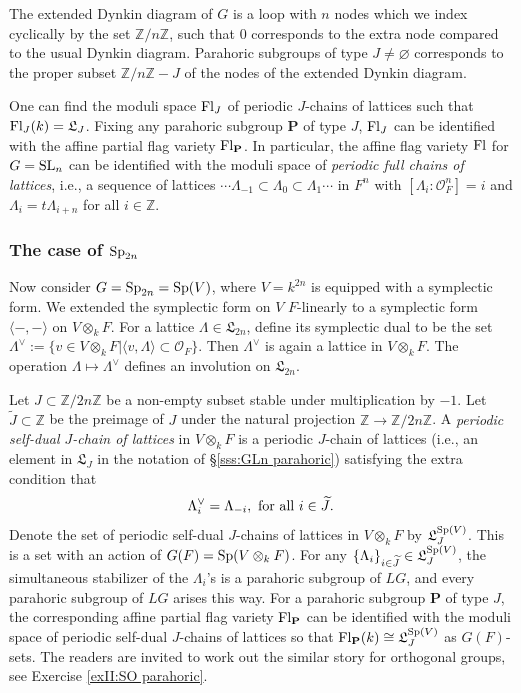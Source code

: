 \documentclass[]{pcmi}
\let\oldsubsubsection\subsubsection
\renewcommand{\subsubsection}[1]{%
\setcounter{subsubsection}{\value{equation}}%
\oldsubsubsection{#1}%
\refstepcounter{equation}%
}
\theoremstyle{plain}
\theoremstyle{definition}
\def\ZZ{\mathbb{Z}}
\def\calO{\mathcal{O}}
\def\bP{\mathbf{P}}
\newcommand\frL{\mathfrak{L}}
\newcommand\tilJ{\widetilde{J}}
\newcommand{\Fl}{\textup{Fl}}
\newcommand\SL{\textup{SL}}
\newcommand\Sp{\textup{Sp}}
\renewcommand{\L}{\Lambda}
\newcommand{\jiao}[1]{\langle{#1}\rangle}
\begin{document}
The extended Dynkin diagram of $G$ is a loop with $n$ nodes which we index cyclically by the set $\ZZ/n\ZZ$, such that $0$ corresponds to the extra node compared to the usual Dynkin diagram. Parahoric subgroups of type $J\neq\varnothing$ corresponds to the proper subset $\ZZ/n\ZZ-J$ of the nodes of the extended Dynkin diagram.
 
One can find the moduli space $\Fl_{J}$ of periodic $J$-chains of lattices such that  $\Fl_{J}(k)=\frL_{J}$. Fixing any parahoric subgroup $\bP$ of type $J$, $\Fl_{J}$ can be identified with the affine partial flag variety $\Fl_{\bP}$.  In particular, the affine flag variety $\Fl$ for $G=\SL_{n}$ can be identified with the moduli space of {\em periodic full chains of lattices}, i.e., a sequence of lattices $\cdots \L_{-1}\subset \L_{0}\subset \L_{1}\cdots$ in $F^{n}$ with $[\L_{i}:\calO^{n}_{F}]=i$ and $\L_{i}=t\L_{i+n}$ for all $i\in\ZZ$.



\subsubsection{The case of $\Sp_{2n}$}\label{sss:Sp parahoric} Now consider $G=\Sp_{2n}=\Sp(V)$, where $V=k^{2n}$ is equipped with a symplectic form. We extended the symplectic form on $V$ $F$-linearly to a symplectic form $\jiao{-,-}$ on $V\otimes_{k}F$. For a lattice $\L\in \frL_{2n}$,  define its symplectic dual to be the set $\L^{\vee}:=\{v\in V\otimes_{k}F|\jiao{v,\L}\subset \calO_{F}\}$. Then $\L^{\vee}$ is again a lattice in $V\otimes_{k}F$. The operation $\L\mapsto \L^{\vee}$ defines an involution on $\frL_{2n}$.  

Let $J\subset\ZZ/2n\ZZ$ be a non-empty subset stable under multiplication by $-1$. Let $\tilJ\subset \ZZ$ be the preimage of $J$ under the natural projection $\ZZ\to\ZZ/2n\ZZ$. A {\em periodic self-dual $J$-chain of lattices} in $V\otimes_{k}F$ is a periodic $J$-chain of lattices (i.e., an element in $\frL_{J}$ in the notation of \S\ref{sss:GLn parahoric}) satisfying the extra condition that
\begin{equation*}
\L^{\vee}_{i}=\L_{-i}, \textup{ for all } i\in \tilJ.
\end{equation*}
Denote the set of periodic self-dual $J$-chains of lattices in $V\otimes_{k}F$ by $\frL^{\Sp(V)}_{J}$. This is a set with an action of $G(F)=\Sp(V\otimes_{k}F)$. For any $\{\L_{i}\}_{i\in\tilJ}\in \frL^{\Sp(V)}_{J}$, the simultaneous stabilizer of the $\L_{i}$'s is a parahoric subgroup of $LG$, and every parahoric subgroup of $LG$ arises this way. For a parahoric subgroup $\bP$ of type $J$, the corresponding affine partial flag variety $\Fl_{\bP}$ can be identified with the moduli space of periodic self-dual $J$-chains of lattices so that $\Fl_{\bP}(k)\cong\frL^{\Sp(V)}_{J}$ as $G(F)$-sets. The readers are invited to work out the similar story for orthogonal groups, see Exercise \ref{exII:SO parahoric}.
\end{document}
